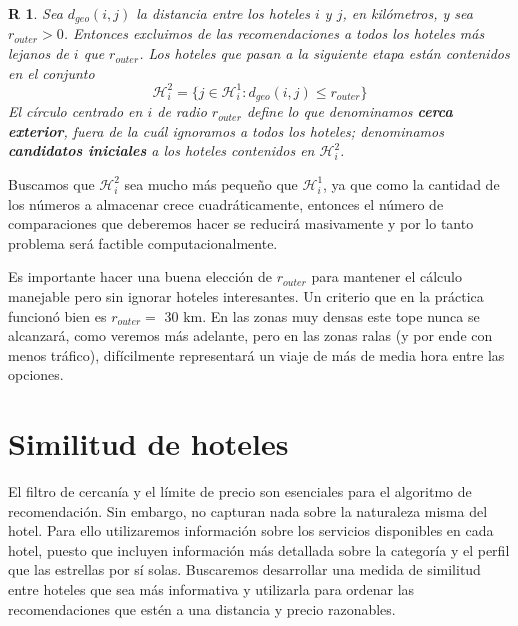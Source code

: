 \documentclass[12pt]{report}
\newtheorem{regla}{R}%
\begin{document}
\begin{regla}
Sea $d_{geo}(i,j)$ la distancia entre los hoteles $i$ y $j$, en kilómetros, y sea $r_{outer} > 0$. Entonces excluimos de las recomendaciones a todos los hoteles más lejanos de $i$ que $r_{outer}$. Los hoteles que pasan a la siguiente etapa están contenidos en el conjunto
\[
\mathcal{H}_i^2 = \{j \in \mathcal{H}_i^1 : d_{geo}(i,j) \leq r_{outer}\}
\]
El círculo centrado en $i$ de radio $r_{outer}$ define lo que denominamos \textbf{cerca exterior}, fuera de la cuál ignoramos a todos los hoteles; denominamos \textbf{candidatos iniciales} a los hoteles contenidos en $\mathcal{H}_i^2$.
\end{regla}
Buscamos que $\mathcal{H}_i^2$ sea mucho más pequeño que $\mathcal{H}_i^1$, ya que como la cantidad de los números a almacenar crece cuadráticamente, entonces el número de comparaciones que deberemos hacer se reducirá masivamente y por lo tanto problema será factible computacionalmente.

Es importante hacer una buena elección de $r_{outer}$ para mantener el cálculo manejable pero sin ignorar hoteles interesantes. Un criterio que en la práctica funcionó bien es $r_{outer} =$ 30 km. En las zonas muy densas este tope nunca se alcanzará, como veremos más adelante, pero en las zonas ralas (y por ende con menos tráfico), difícilmente representará un viaje de más de media hora entre las opciones.

\section{Similitud de hoteles}

El filtro de cercanía y el límite de precio son esenciales para el algoritmo de recomendación. Sin embargo, no capturan nada sobre la naturaleza misma del hotel. Para ello utilizaremos información sobre los servicios disponibles en cada hotel, puesto que incluyen información más detallada sobre la categoría y el perfil que las estrellas por sí solas. Buscaremos desarrollar una medida de similitud entre hoteles que sea más informativa y utilizarla para ordenar las recomendaciones que estén a una distancia y precio razonables.
\end{document}
